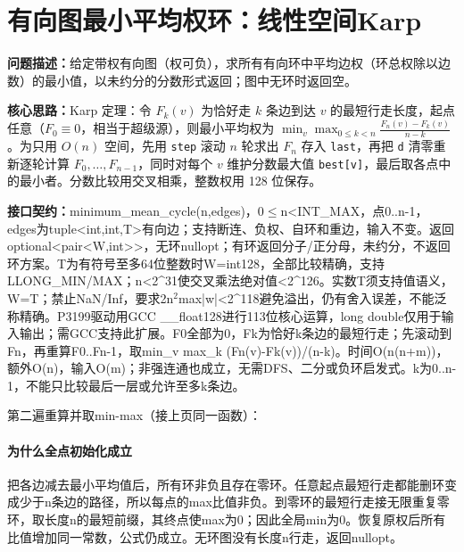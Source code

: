 \section{有向图最小平均权环：线性空间Karp}\label{compact-minimum_mean_cycle}

\noindent\textbf{问题描述：}\allowbreak 给定带权有向图（权可负），求所有有向环中平均边权（环总权除以边数）的最小值，以未约分的分数形式返回；图中无环时返回空。

\textbf{核心思路：}\allowbreak Karp 定理：令 $F_k(v)$ 为恰好走 $k$ 条边到达 $v$ 的最短行走长度，起点任意（$F_0\equiv0$，相当于超级源），则最小平均权为 $\min_v\max_{0\le k<n}\frac{F_n(v)-F_k(v)}{n-k}$。为只用 $O(n)$ 空间，先用 \texttt{step} 滚动 $n$ 轮求出 $F_n$ 存入 \texttt{last}，再把 \texttt{d} 清零重新逐轮计算 $F_0,\dots,F_{n-1}$，同时对每个 $v$ 维护分数最大值 \texttt{best[v]}，最后取各点中的最小者。分数比较用交叉相乘，整数权用 128 位保存。



{\sloppy{}\noindent\textbf{接口契约：}minimum\_mean\_cycle(n,edges)，0$\le$n<INT\_MAX，点0..n-1，edges为tuple<int,int,T>有向边；支持断连、负权、自环和重边，输入不变。返回optional<pair<W,int>>，无环nullopt；有环返回分子/正分母，未约分，不返回环方案。T为有符号至多64位整数时W=int128，全部比较精确，支持LLONG\_MIN/MAX；n<2\textasciicircum{}31使交叉乘法绝对值<2\textasciicircum{}126。实数T须支持值语义，W=T；禁止NaN/Inf，要求2n$^{2}$max|w|<2\textasciicircum{}118避免溢出，仍有舍入误差，不能泛称精确。P3199驱动用GCC \_\_float128进行113位核心运算，long double仅用于输入输出；需GCC支持此扩展。F0全部为0，Fk为恰好k条边的最短行走；先滚动到Fn，再重算F0..Fn-1，取min\_v max\_k (Fn(v)-Fk(v))/(n-k)。时间O(n(n+m))，额外O(n)，输入O(m)；非强连通也成立，无需DFS、二分或负环启发式。k为0..n-1，不能只比较最后一层或允许至多k条边。\par}



\newpage\noindent 第二遍重算并取min-max（接上页同一函数）：



\paragraph{为什么全点初始化成立} 把各边减去最小平均值后，所有环非负且存在零环。任意起点最短行走都能删环变成少于n条边的路径，所以每点的max比值非负。到零环的最短行走接无限重复零环，取长度n的最短前缀，其终点使max为0；因此全局min为0。恢复原权后所有比值增加同一常数，公式仍成立。无环图没有长度n行走，返回nullopt。


